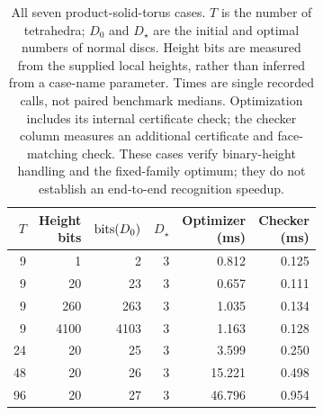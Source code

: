 \begin{table}[H]
\centering\footnotesize
\setlength{\tabcolsep}{3pt}
\renewcommand{\arraystretch}{1.12}
\begin{tabular*}{\linewidth}{@{\extracolsep{\fill}}rrrrrr@{}}
\toprule
$T$ & \shortstack{Height\\bits} & $\operatorname{bits}(D_0)$ & $D_\star$ & \shortstack{Optimizer\\(ms)} & \shortstack{Checker\\(ms)}\\
\midrule
9 & 1 & 2 & 3 & 0.812 & 0.125\\
9 & 20 & 23 & 3 & 0.657 & 0.111\\
9 & 260 & 263 & 3 & 1.035 & 0.134\\
9 & 4100 & 4103 & 3 & 1.163 & 0.128\\
24 & 20 & 25 & 3 & 3.599 & 0.250\\
48 & 20 & 26 & 3 & 15.221 & 0.498\\
96 & 20 & 27 & 3 & 46.796 & 0.954\\
\bottomrule
\end{tabular*}
\caption{All seven product-solid-torus cases. $T$ is the number of tetrahedra; $D_0$ and $D_\star$ are the initial and optimal numbers of normal discs. Height bits are measured from the supplied local heights, rather than inferred from a case-name parameter. Times are single recorded calls, not paired benchmark medians. Optimization includes its internal certificate check; the checker column measures an additional certificate and face-matching check. These cases verify binary-height handling and the fixed-family optimum; they do not establish an end-to-end recognition speedup.}
\label{tab:cocycle-times}
\end{table}
